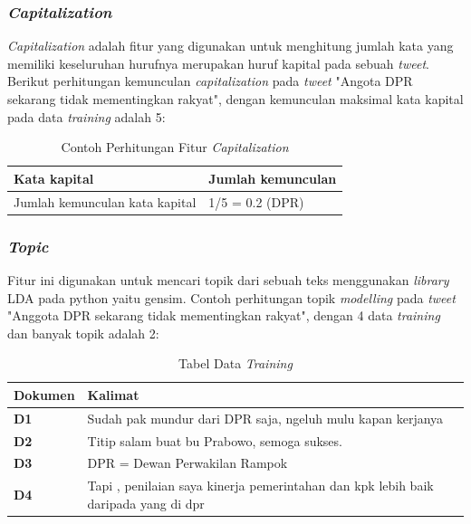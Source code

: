 \subsubsection{\textit{Capitalization}}
\textit{Capitalization} adalah fitur yang digunakan untuk menghitung jumlah kata yang memiliki keseluruhan hurufnya merupakan huruf kapital pada sebuah \textit{tweet}. Berikut perhitungan kemunculan \textit{capitalization} pada \textit{tweet} "Angota DPR sekarang tidak mementingkan rakyat", dengan kemunculan maksimal kata kapital pada data \textit{training} adalah 5:

\begin{table}[H]
	\caption{Contoh Perhitungan Fitur \textit{Capitalization}}
	\centering
	\small
	\begin{adjustbox}{width=1\textwidth}
	\begin{tabular}{|p{7cm}|p{6cm}|}
		\hline
		\textbf{Kata kapital} & \textbf{Jumlah kemunculan}\\
		\hline
		Jumlah kemunculan kata kapital & 1/5 = 0.2 (DPR) \\
		\hline
	\end{tabular}
	\end{adjustbox}
\end{table}
\subsubsection{\textit{Topic}}
Fitur ini digunakan untuk mencari topik dari sebuah teks menggunakan \textit{library} LDA pada python yaitu gensim. Contoh perhitungan topik \textit{modelling} pada \textit{tweet} "Anggota DPR sekarang tidak mementingkan rakyat", dengan 4 data \textit{training }dan banyak topik adalah 2:

\begin{table}[H]
	\caption{Tabel Data \textit{Training}}
	\centering
	\small
	\begin{adjustbox}{width=1\textwidth}
	\begin{tabular}{|p{3cm}|p{10cm}|}
		\hline
		\textbf{Dokumen} & \textbf{Kalimat} \\
		\hline
		\textbf{D1} & Sudah pak mundur dari DPR saja, ngeluh mulu kapan kerjanya \\
		\hline
		\textbf{D2} & Titip salam buat bu Prabowo, semoga sukses. \\
		\hline
		\textbf{D3} & DPR = Dewan Perwakilan Rampok \\
		\hline
		\textbf{D4} & Tapi , penilaian saya kinerja pemerintahan dan kpk lebih baik 
		daripada yang di dpr \\
		\hline
	\end{tabular}
	\end{adjustbox}
\end{table}

